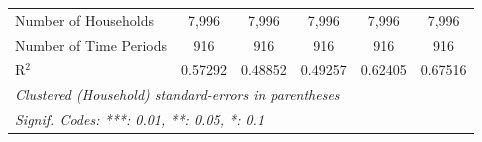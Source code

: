 \begin{table}[htbp]
\begin{tabular}{lccccc}
      Number of Households                  & 7,996          & 7,996          & 7,996           & 7,996           & 7,996\\  
      Number of Time Periods                          & 916            & 916            & 916             & 916             & 916\\  
      R$^2$                                           & 0.57292        & 0.48852        & 0.49257         & 0.62405         & 0.67516\\  
      \midrule \midrule
      \multicolumn{6}{l}{\emph{Clustered (Household) standard-errors in parentheses}}\\
      \multicolumn{6}{l}{\emph{Signif. Codes: ***: 0.01, **: 0.05, *: 0.1}}\\
   \end{tabular}
\end{table}


